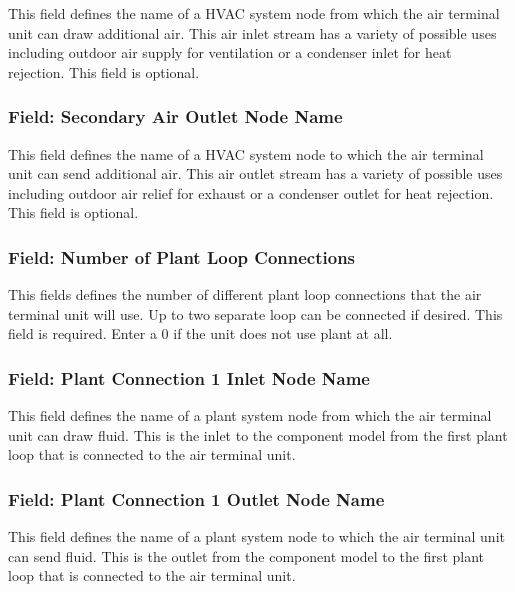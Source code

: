 This field defines the name of a HVAC system node from which the air terminal unit can draw additional air. This air inlet stream has a variety of possible uses including outdoor air supply for ventilation or a condenser inlet for heat rejection. This field is optional.

\subsubsection{Field: Secondary Air Outlet Node Name}\label{field-secondary-air-outlet-node-name-1}

This field defines the name of a HVAC system node to which the air terminal unit can send additional air. This air outlet stream has a variety of possible uses including outdoor air relief for exhaust or a condenser outlet for heat rejection. This field is optional.

\subsubsection{Field: Number of Plant Loop Connections}\label{field-number-of-plant-loop-connections-1}

This fields defines the number of different plant loop connections that the air terminal unit will use. Up to two separate loop can be connected if desired. This field is required. Enter a 0 if the unit does not use plant at all.

\subsubsection{Field: Plant Connection 1 Inlet Node Name}\label{field-plant-connection-1-inlet-node-name-1}

This field defines the name of a plant system node from which the air terminal unit can draw fluid. This is the inlet to the component model from the first plant loop that is connected to the air terminal unit.

\subsubsection{Field: Plant Connection 1 Outlet Node Name}\label{field-plant-connection-1-outlet-node-name-1}

This field defines the name of a plant system node to which the air terminal unit can send fluid. This is the outlet from the component model to the first plant loop that is connected to the air terminal unit.

